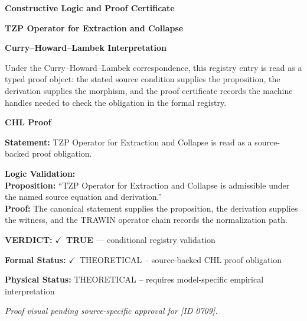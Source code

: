 \clearpage
\begingroup\tzpsupportsetup
\noindent\textbf{\fontsize{10.8pt}{12.8pt}\selectfont [ID 0709] Constructive Logic and Proof Certificate}\par
\noindent\textbf{\fontsize{10pt}{12pt}\selectfont TZP Operator for Extraction and Collapse}\par
\vspace{0.45em}
\begingroup
\footnotesize
\setlength{\parskip}{0.22em}
\setlength{\parindent}{0pt}
\noindent\textbf{Curry--Howard--Lambek Interpretation}\par
Under the Curry--Howard--Lambek correspondence, this registry entry is read as a typed proof
object: the stated source condition supplies the proposition, the derivation supplies the
morphism, and the proof certificate records the machine handles needed to check the obligation
in the formal registry.

\vspace{0.45em}
\noindent\textbf{CHL Proof}\par
\textbf{Statement:} TZP Operator for Extraction and Collapse is read as a source-backed proof obligation.

\textbf{Logic Validation:}\\
\textbf{Proposition:} ``TZP Operator for Extraction and Collapse is admissible under the named source equation and derivation.''\\
\textbf{Proof:} The canonical statement supplies the proposition, the derivation supplies the witness, and the TRAWIN operator chain records the normalization path.

\textbf{VERDICT:} \ensuremath{\checkmark}\ \textbf{TRUE} --- conditional registry validation

\textbf{Formal Status:} \ensuremath{\checkmark}\ THEORETICAL -- source-backed CHL proof obligation

\textbf{Physical Status:} THEORETICAL -- requires model-specific empirical interpretation
\par\vspace{0.45em}
\par
\vfill
\begingroup\footnotesize\itshape
Proof visual pending source-specific approval for [ID 0709].
\par\endgroup
\vfill
\endgroup
\endgroup
